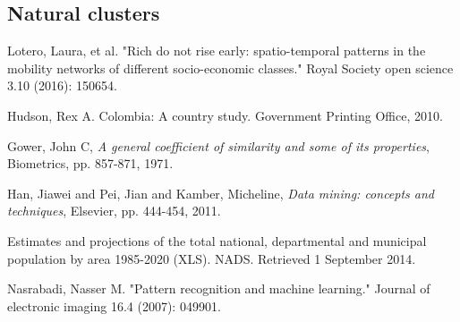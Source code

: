 \documentclass[runningheads]{llncs}
\begin{document}
	\subsection{Natural clusters} \label{subsec: classification}
	
	

	
	
	
	
	
	
	
	
	
	
	\begin{thebibliography}{8}
		Lotero, Laura, et al. "Rich do not rise early: spatio-temporal patterns in the mobility networks of different socio-economic classes." Royal Society open science 3.10 (2016): 150654.
		
		Hudson, Rex A. Colombia: A country study. Government Printing Office, 2010.
		
		Gower, John C,
		\emph{A general coefficient of similarity and some of its properties},
		Biometrics, pp. 857-871,
		1971.
		
		Han, Jiawei and Pei, Jian and Kamber, Micheline,
		\emph{Data mining: concepts and techniques},
		Elsevier, pp. 444-454,
		2011.
		
		Estimates and projections of the total national, departmental and municipal population by area 1985-2020 (XLS). NADS. Retrieved 1 September 2014.
		
		Nasrabadi, Nasser M. "Pattern recognition and machine learning." Journal of electronic imaging 16.4 (2007): 049901.
	\end{thebibliography}
\end{document}
